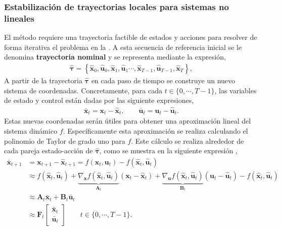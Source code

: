 \subsubsection{Estabilización de trayectorias locales para sistemas no lineales}
El método requiere una trayectoria factible de estados y acciones para resolver de forma iterativa el problema en la . A esta secuencia de referencia inicial se le denomina \textbf{trayectoria nominal} y se representa mediante la expresión,
\begin{align}
\hat{\bm\tau} = \left\{\hat{\mathbf{x}}_0, \hat{\mathbf{u}}_0, \hat{\mathbf{x}}_1, \hat{\mathbf{u}}_1\cdots, \hat{\mathbf{x}}_{T-1}, \hat{\mathbf{u}}_{T-1}, \hat{\mathbf{x}}_{T} \right\},    
\label{eq:nominal_traj}
\end{align}
A partir de la trayectoria $\hat{\bm\tau}$ en cada paso de tiempo se construye un nuevo sistema de coordenadas. Concretamente, para cada $t \in \{0, \cdots, T-1\}$, las variables de estado y control están dadas por las siguiente expresiones,
\begin{align}
    \bar{\mathbf{x}}_t = \mathbf{x}_t - \hat{\mathbf{x}}_t, \qquad \bar{\mathbf{u}}_t = \mathbf{u}_t - \hat{\mathbf{u}}_t.
\end{align}
Estas nuevas coordenadas serán útiles para obtener una aproximación lineal del sistema dinámico $f$. Específicamente esta aproximación se realiza calculando el polinomio de Taylor de grado uno para $f$. Este cálculo se realiza alrededor de cada pareja estado-acción de $\hat{\bm{\tau}}$, como se muestra en la siguiente expresión \cite{underactuated},
\begin{equation}
    \begin{aligned}
    \bar{\mathbf{x}}_{t+1} &= \mathbf{x}_{t+1} - \hat{\mathbf{x}}_{t+1} = f(\mathbf{x}_t, \mathbf{u}_t) - f(\hat{\mathbf{x}}_t, \hat{\mathbf{u}}_{t}) \\
    &\approx f(\hat{\mathbf{x}}_t, \hat{\mathbf{u}}_t) + \underbrace{\nabla_{\mathbf{x}} f(\hat{\mathbf{x}}_t, \hat{\mathbf{u}}_t)}_{\mathbf{A}_t}(\mathbf{x}_t - \hat{\mathbf{x}}_t) + \underbrace{\nabla_{\mathbf{u}} f(\hat{\mathbf{x}}_t, \hat{\mathbf{u}}_t)}_{\mathbf{B}_t} (\mathbf{u}_t - \hat{\mathbf{u}}_t) -f(\hat{\mathbf{x}}_t, \hat{\mathbf{u}}_t) \\
    & \approx \mathbf{A}_t \bar{\mathbf{x}}_t + \mathbf{B}_t \bar{\mathbf{u}}_t \\
    & \approx \mathbf{F}_{t} 
    \begin{bmatrix}
        \bar{\mathbf{x}}_t \\
        \bar{\mathbf{u}}_t
    \end{bmatrix}\qquad t\in \{0, \cdots, T-1\}.
    \end{aligned}
    \label{eq:taylor_control_system}
\end{equation} 


